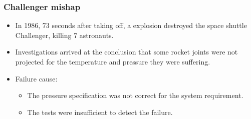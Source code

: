 \begin{frame}[hasprev=false,hasnext=false]
\frametitle{Challenger mishap}
\label{example:challenger-mishap}

\begin{itemize}
	\item In 1986, 73 seconds after taking off, a explosion destroyed the space
	shuttle Challenger, killing 7 astronauts.

	\item Investigations arrived at the conclusion that some rocket joints were
	not projected for the temperature and pressure they were suffering.

	\item Failure cause:
	\begin{itemize}
		\item The pressure specification was not correct for the system
		requirement.

		\item The tests were insufficient to detect the failure.
	\end{itemize}
\end{itemize}
\end{frame}



